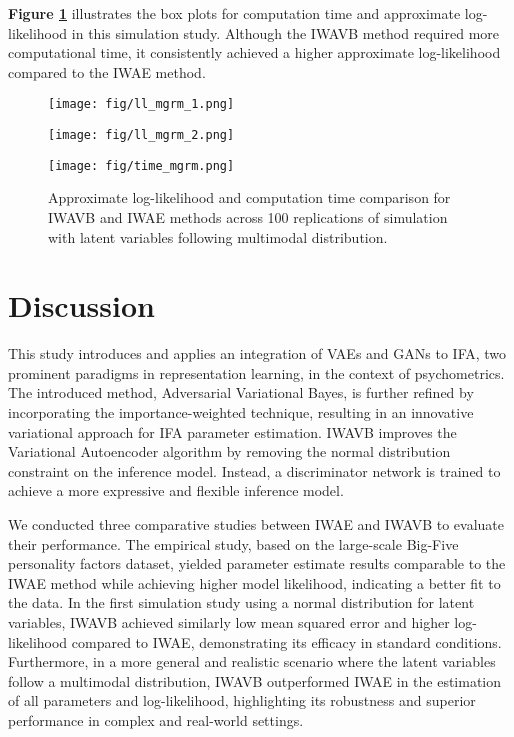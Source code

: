 \documentclass[a4paper,12pt]{article}
\theoremstyle{plain} %
\theoremstyle{remark} %
\theoremstyle{definition} %
\begin{document}
\textbf{Figure \ref{fig:time_ll_mgrm}} illustrates the box plots for computation time and approximate log-likelihood in this simulation study. Although the IWAVB method required more computational time, it consistently achieved a higher approximate log-likelihood compared to the IWAE method.
\begin{figure}[!htb]
    \centering
    \begin{minipage}{0.4\textwidth}
    \centering
    \texttt{[image: fig/ll\_mgrm\_1.png]}
    \end{minipage}
    \hfill
    \begin{minipage}{0.47\textwidth}
    \centering
    \texttt{[image: fig/ll\_mgrm\_2.png]}
    \end{minipage}
        
    \begin{minipage}{0.45\textwidth}
    \centering
    \texttt{[image: fig/time\_mgrm.png]}
    \end{minipage}
    \caption{Approximate log-likelihood and computation time comparison for IWAVB and IWAE methods across 100 replications of simulation with latent variables following multimodal distribution.}
    \label{fig:time_ll_mgrm}
\end{figure}

\section{Discussion}
This study introduces and applies an integration of VAEs and GANs to IFA, two prominent paradigms in representation learning, in the context of psychometrics. The introduced method, Adversarial Variational Bayes, is further refined by incorporating the importance-weighted technique, resulting in an innovative variational approach for IFA parameter estimation. IWAVB improves the Variational Autoencoder algorithm by removing the normal distribution constraint on the inference model. Instead, a discriminator network is trained to achieve a more expressive and flexible inference model. 

We conducted three comparative studies between IWAE and IWAVB to evaluate their performance. The empirical study, based on the large-scale Big-Five personality factors dataset, yielded parameter estimate results comparable to the IWAE method while achieving higher model likelihood, indicating a better fit to the data. In the first simulation study using a normal distribution for latent variables, IWAVB achieved similarly low mean squared error and higher log-likelihood compared to IWAE, demonstrating its efficacy in standard conditions. Furthermore, in a more general and realistic scenario where the latent variables follow a multimodal distribution, IWAVB outperformed IWAE in the estimation of all parameters and log-likelihood, highlighting its robustness and superior performance in complex and real-world settings.
\end{document}
